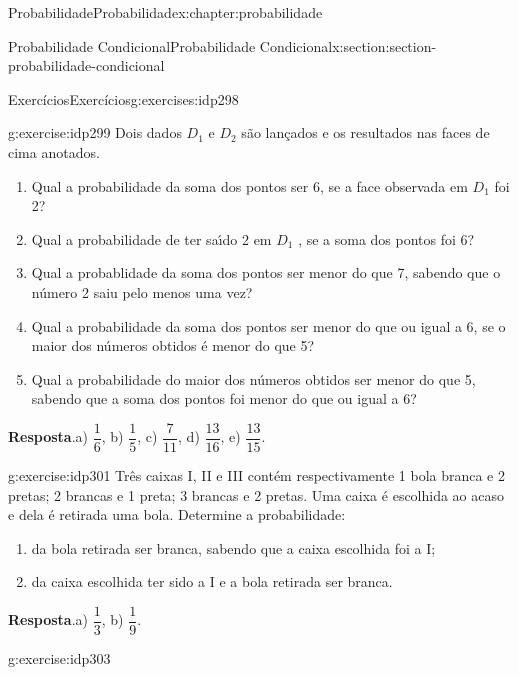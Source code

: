 \documentclass[oneside,10pt,]{book}
\newcommand{\blocktitlefont}{\relax}
\numberwithin{equation}{section}
\begin{document}
\begin{chapterptx}{Probabilidade}{}{Probabilidade}{}{}{x:chapter:probabilidade}
\begin{sectionptx}{Probabilidade Condicional}{}{Probabilidade Condicional}{}{}{x:section:section-probabilidade-condicional}
%
%
\typeout{************************************************}
\typeout{************************************************}
%
\begin{exercises-subsection}{Exercícios}{}{Exercícios}{}{}{g:exercises:idp298}
\begin{divisionexercise}{1}{}{}{g:exercise:idp299}%
Dois dados \(D_1\) e \(D_2\) são lançados e os resultados nas faces de cima anotados.%
\begin{enumerate}[label=(\alph*)]
\item{}Qual a probabilidade da soma dos pontos ser 6, se a face observada em \(D_1\) foi 2?%
\item{}Qual a probabilidade de ter saı́do 2 em \(D_1\) , se a soma dos pontos foi 6?%
\item{}Qual a probablidade da soma dos pontos ser menor do que 7, sabendo que o número 2 saiu pelo menos uma vez?%
\item{}Qual a probabilidade da soma dos pontos ser menor do que ou igual a 6, se o maior dos números obtidos é menor do que 5?%
\item{}Qual a probabilidade do maior dos números obtidos ser menor do que 5, sabendo que a soma dos pontos foi menor do que ou igual a 6?%
\end{enumerate}
%
\par\smallskip%
\noindent\textbf{\blocktitlefont Resposta}.\hypertarget{g:answer:idp300}{}\quad{}a) \(\dfrac{1}{6}\), b) \(\dfrac{1}{5}\), c) \(\dfrac{7}{11}\), d) \(\dfrac{13}{16}\), e) \(\dfrac{13}{15}\).%
\end{divisionexercise}%
\begin{divisionexercise}{2}{}{}{g:exercise:idp301}%
Três caixas I, II e III contém respectivamente 1 bola branca e 2 pretas; 2 brancas e 1 preta; 3 brancas e 2 pretas. Uma caixa é escolhida ao acaso e dela é retirada uma bola. Determine a probabilidade:%
%
\begin{enumerate}[label=(\alph*)]
\item{}da bola retirada ser branca, sabendo que a caixa escolhida foi a I;%
\item{}da caixa escolhida ter sido a I e a bola retirada ser branca.%
\end{enumerate}
\par\smallskip%
\noindent\textbf{\blocktitlefont Resposta}.\hypertarget{g:answer:idp302}{}\quad{}a) \(\dfrac{1}{3}\), b) \(\dfrac{1}{9}\).%
\end{divisionexercise}%
\begin{divisionexercise}{3}{}{}{g:exercise:idp303}%

\end{divisionexercise}
\end{exercises-subsection}
\end{sectionptx}
\end{chapterptx}
\end{document}
